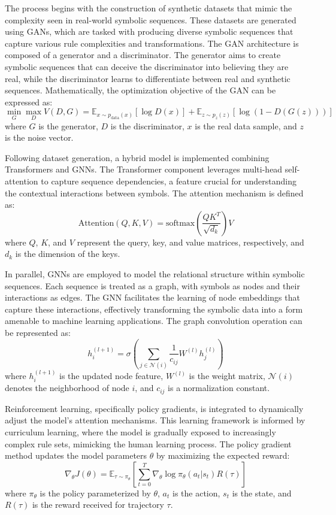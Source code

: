 \documentclass{article}
\begin{document}
The process begins with the construction of synthetic datasets that mimic the complexity seen in real-world symbolic sequences. These datasets are generated using GANs, which are tasked with producing diverse symbolic sequences that capture various rule complexities and transformations. The GAN architecture is composed of a generator and a discriminator. The generator aims to create symbolic sequences that can deceive the discriminator into believing they are real, while the discriminator learns to differentiate between real and synthetic sequences. Mathematically, the optimization objective of the GAN can be expressed as:
\[
\min_G \max_D V(D, G) = \mathbb{E}_{x \sim p_{\text{data}}(x)}[\log D(x)] + \mathbb{E}_{z \sim p_z(z)}[\log(1 - D(G(z)))]
\]
where \(G\) is the generator, \(D\) is the discriminator, \(x\) is the real data sample, and \(z\) is the noise vector.

Following dataset generation, a hybrid model is implemented combining Transformers and GNNs. The Transformer component leverages multi-head self-attention to capture sequence dependencies, a feature crucial for understanding the contextual interactions between symbols. The attention mechanism is defined as:
\[
\text{Attention}(Q, K, V) = \text{softmax}\left(\frac{QK^T}{\sqrt{d_k}}\right)V
\]
where \(Q\), \(K\), and \(V\) represent the query, key, and value matrices, respectively, and \(d_k\) is the dimension of the keys.

In parallel, GNNs are employed to model the relational structure within symbolic sequences. Each sequence is treated as a graph, with symbols as nodes and their interactions as edges. The GNN facilitates the learning of node embeddings that capture these interactions, effectively transforming the symbolic data into a form amenable to machine learning applications. The graph convolution operation can be represented as:
\[
h_i^{(l+1)} = \sigma \left( \sum_{j \in \mathcal{N}(i)} \frac{1}{c_{ij}} W^{(l)} h_j^{(l)} \right)
\]
where \(h_i^{(l+1)}\) is the updated node feature, \(W^{(l)}\) is the weight matrix, \(\mathcal{N}(i)\) denotes the neighborhood of node \(i\), and \(c_{ij}\) is a normalization constant.

Reinforcement learning, specifically policy gradients, is integrated to dynamically adjust the model's attention mechanisms. This learning framework is informed by curriculum learning, where the model is gradually exposed to increasingly complex rule sets, mimicking the human learning process. The policy gradient method updates the model parameters \(\theta\) by maximizing the expected reward:
\[
\nabla_\theta J(\theta) = \mathbb{E}_{\tau \sim \pi_\theta} \left[ \sum_{t=0}^{T} \nabla_\theta \log \pi_\theta(a_t | s_t) R(\tau) \right]
\]
where \(\pi_\theta\) is the policy parameterized by \(\theta\), \(a_t\) is the action, \(s_t\) is the state, and \(R(\tau)\) is the reward received for trajectory \(\tau\).
\end{document}
